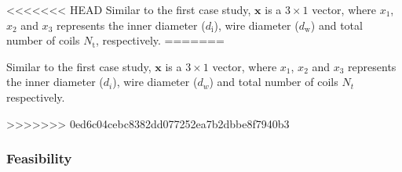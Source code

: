 \documentclass[10pt]{article}
\begin{document}
<<<<<<< HEAD
Similar to the first case study, $\textbf{x}$ is a $3 \times 1$ vector, where $x_{1}$, $x_{2}$ and $x_{3}$ represents the inner diameter ($d_{\text{i}}$), wire diameter ($d_{\text{w}}$) and total number of coils $N_{\text{t}}$, respectively.
=======
	
%			
%    

\begin{flushleft}
Similar to the first case study, $\textbf{x}$ is a $3 \times 1$ vector, where $x_{1}$, $x_{2}$ and $x_{3}$ represents the inner diameter ($d_{i}$), wire diameter ($d_{w}$) and total number of coils $N_{t}$ respectively.
\end{flushleft}
>>>>>>> 0ed6c04cebc8382dd077252ea7b2dbbe8f7940b3


\newpage
\subsubsection{Feasibility}
	
\end{document}
